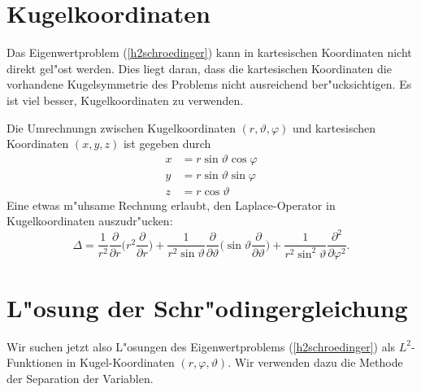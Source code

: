 \section{Kugelkoordinaten}
Das Eigenwertproblem (\ref{h2schroedinger}) kann in kartesischen Koordinaten
nicht direkt gel"ost werden. Dies liegt daran, dass die kartesischen
Koordinaten die vorhandene Kugelsymmetrie des Problems nicht ausreichend
ber"ucksichtigen. Es ist viel besser, Kugelkoordinaten zu verwenden.

Die Umrechnungn zwischen Kugelkoordinaten $(r,\vartheta,\varphi)$ und
kartesischen Koordinaten $(x,y,z)$ ist gegeben durch
\begin{align*}
x&=r
\sin\vartheta
\cos\varphi
\\
y&=r
\sin\vartheta
\sin\varphi
\\
z&=r\cos \vartheta
\end{align*}
Eine etwas m"uhsame Rechnung erlaubt, den Laplace-Operator in Kugelkoordinaten
auszudr"ucken:
\[
\Delta
=
\frac1{r^2}\frac{\partial}{\partial r}\biggl(
r^2\frac{\partial}{\partial r}
\biggr)
+\frac1{r^2\sin\vartheta}\frac{\partial}{\partial \vartheta}\biggl(
 \sin\vartheta \frac{\partial}{\partial\vartheta}
\biggr)
+
\frac1{r^2\sin^2\vartheta}\frac{\partial^2}{\partial\varphi^2}.
\]

\section{L"osung der Schr"odingergleichung}
Wir suchen jetzt also L"osungen des Eigenwertproblems (\ref{h2schroedinger})
als $L^2$-Funktionen in Kugel-Koordinaten $(r,\varphi,\vartheta)$. Wir
verwenden dazu die Methode der Separation der Variablen.

